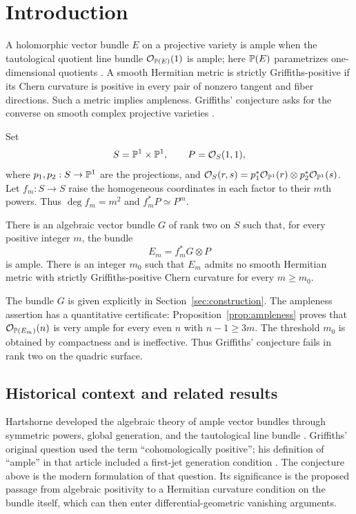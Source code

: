 \section{Introduction}
\label{sec:introduction}

A holomorphic vector bundle $E$ on a projective variety is ample when
the tautological quotient line bundle $\mathcal O_{\mathbb P(E)}(1)$ is ample;
here $\mathbb P(E)$ parametrizes one-dimensional quotients
\cite[Proposition~3.2]{Hartshorne1966}.
A smooth Hermitian metric is strictly Griffiths-positive if its Chern
curvature is positive in every pair of nonzero tangent and fiber
directions. Such a metric implies ampleness. Griffiths' conjecture asks
for the converse on smooth complex projective varieties
\cite[Problem~(0.9)]{Griffiths1969}.

Set
\[
 S=\mathbb P^1\times\mathbb P^1,\qquad P=\mathcal O_S(1,1),
\]
where $p_1,p_2:S\to\mathbb P^1$ are the projections, and
$\mathcal O_S(r,s)=p_1^*\mathcal O_{\mathbb P^1}(r)\otimes p_2^*\mathcal O_{\mathbb P^1}(s)$.
Let $f_m:S\to S$ raise the homogeneous coordinates in each factor
to their $m$th powers. Thus $\deg f_m=m^2$ and $f_m^*P\simeq P^m$.

\begin{theorem}\label{thm:main}
There is an algebraic vector bundle $G$ of rank two on $S$ such that,
for every positive integer $m$, the bundle
\[
 E_m=f_m^*G\otimes P
\]
is ample. There is an integer $m_0$ such that $E_m$ admits no smooth
Hermitian metric with strictly Griffiths-positive Chern curvature
for every $m\ge m_0$.
\end{theorem}

The bundle $G$ is given explicitly in Section~\ref{sec:construction}.
The ampleness assertion has a quantitative certificate:
Proposition~\ref{prop:ampleness} proves that $\mathcal O_{\mathbb P(E_m)}(n)$ is
very ample for every even $n$ with $n-1\geq3m$.
The threshold $m_0$ is obtained by compactness and is ineffective.
Thus Griffiths' conjecture fails in rank two on the quadric surface.

\subsection*{Historical context and related results}

Hartshorne developed the algebraic theory of ample vector bundles
through symmetric powers, global generation, and the tautological
line bundle \cite{Hartshorne1966}. Griffiths' original question used
the term ``cohomologically positive''; his definition of ``ample'' in
that article included a first-jet generation condition
\cite[Definitions~(0.2)--(0.3), Problem~(0.9)]{Griffiths1969}.
The conjecture above is the modern formulation of that question.
Its significance is the proposed passage from algebraic positivity
to a Hermitian curvature condition on the bundle itself, which can
then enter differential-geometric vanishing arguments.

